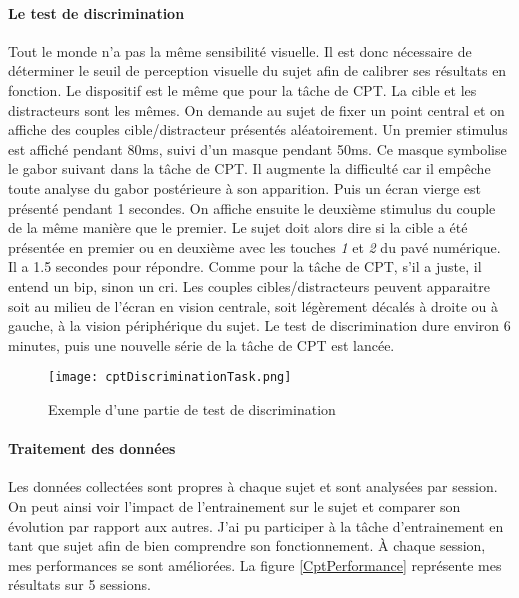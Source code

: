 \paragraph{Le test de discrimination}Tout le monde n'a pas la même sensibilité visuelle. Il est donc nécessaire de déterminer le seuil de perception visuelle du sujet afin de calibrer
ses résultats en fonction. Le dispositif est le même que pour la tâche de CPT. La cible et les distracteurs sont les mêmes. On demande au sujet de fixer un point central et on affiche
des couples cible/distracteur présentés aléatoirement. Un premier stimulus est affiché pendant 80ms, suivi d'un masque pendant 50ms. Ce masque symbolise le gabor suivant dans la
tâche de CPT. Il augmente la difficulté car il empêche toute analyse du gabor postérieure à son apparition. Puis un écran vierge est présenté pendant 1 secondes. On affiche ensuite
le deuxième stimulus du couple de la même manière que le premier. Le sujet doit alors dire si la cible a été présentée en premier ou en deuxième avec les touches \emph{1} et \emph{2}
du pavé numérique. Il a 1.5 secondes pour répondre. Comme pour la tâche de CPT, s'il a juste, il entend un bip, sinon un cri. Les couples cibles/distracteurs peuvent apparaitre soit
au milieu de l'écran en vision centrale, soit légèrement décalés à droite ou à gauche, à la vision périphérique du sujet. Le test de discrimination dure environ 6 minutes, puis une
nouvelle série de la tâche de CPT est lancée.

\begin{figure}[H]
    \begin{center}
    \texttt{[image: cptDiscriminationTask.png]}
    \end{center}
    \caption{Exemple d'une partie de test de discrimination}
\label{CptDiscriminationTask}
\end{figure}


\paragraph{Traitement des données}Les données collectées sont propres à chaque sujet et sont analysées par session. On peut ainsi voir l'impact de l'entrainement sur le
sujet et comparer son évolution par rapport aux autres. J'ai pu participer à la tâche d'entrainement en tant que sujet afin de bien comprendre son fonctionnement. \`{A}
chaque session, mes performances se sont améliorées. La figure \ref{CptPerformance} représente mes résultats sur 5 sessions.

